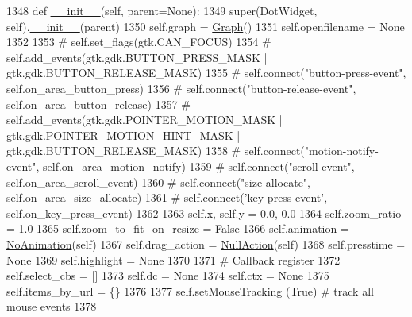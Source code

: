 \begin{DoxyCode}
1348     \textcolor{keyword}{def }\hyperlink{namespacesmacc__viewer_1_1xdot_1_1xdot__qt_a485164cd671e60eab21f82c07366882a}{\_\_init\_\_}(self,  parent=None):
1349         super(DotWidget,  self).\hyperlink{namespacesmacc__viewer_1_1xdot_1_1xdot__qt_a485164cd671e60eab21f82c07366882a}{\_\_init\_\_}(parent)
1350         self.graph = \hyperlink{classsmacc__viewer_1_1xdot_1_1xdot__qt_1_1Graph}{Graph}()
1351         self.openfilename = \textcolor{keywordtype}{None}
1352 
1353 \textcolor{comment}{#        self.set\_flags(gtk.CAN\_FOCUS)}
1354 \textcolor{comment}{#        self.add\_events(gtk.gdk.BUTTON\_PRESS\_MASK | gtk.gdk.BUTTON\_RELEASE\_MASK)}
1355 \textcolor{comment}{#        self.connect("button-press-event", self.on\_area\_button\_press)}
1356 \textcolor{comment}{#        self.connect("button-release-event", self.on\_area\_button\_release)}
1357 \textcolor{comment}{#        self.add\_events(gtk.gdk.POINTER\_MOTION\_MASK | gtk.gdk.POINTER\_MOTION\_HINT\_MASK |
       gtk.gdk.BUTTON\_RELEASE\_MASK)}
1358 \textcolor{comment}{#        self.connect("motion-notify-event", self.on\_area\_motion\_notify)}
1359 \textcolor{comment}{#        self.connect("scroll-event", self.on\_area\_scroll\_event)}
1360 \textcolor{comment}{#        self.connect("size-allocate", self.on\_area\_size\_allocate)}
1361 \textcolor{comment}{#        self.connect('key-press-event', self.on\_key\_press\_event)}
1362 
1363         self.x, self.y = 0.0, 0.0
1364         self.zoom\_ratio = 1.0
1365         self.zoom\_to\_fit\_on\_resize = \textcolor{keyword}{False}
1366         self.animation = \hyperlink{classsmacc__viewer_1_1xdot_1_1xdot__qt_1_1NoAnimation}{NoAnimation}(self)
1367         self.drag\_action = \hyperlink{classsmacc__viewer_1_1xdot_1_1xdot__qt_1_1NullAction}{NullAction}(self)
1368         self.presstime = \textcolor{keywordtype}{None}
1369         self.highlight = \textcolor{keywordtype}{None}
1370 
1371         \textcolor{comment}{# Callback register}
1372         self.select\_cbs = []
1373         self.dc = \textcolor{keywordtype}{None}
1374         self.ctx = \textcolor{keywordtype}{None}
1375         self.items\_by\_url = \{\}
1376 
1377         self.setMouseTracking (\textcolor{keyword}{True}) \textcolor{comment}{# track all mouse events}
1378 
\end{DoxyCode}
